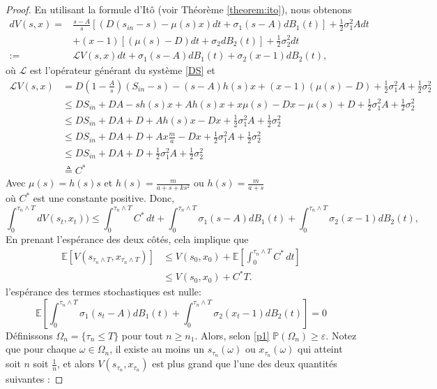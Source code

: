 \documentclass[12pt,a4paper]{report}%
\begin{document}
\begin{proof}
	En utilisant la formule d'Itô (voir Théorème \ref{theorem:ito}), nous obtenons
	$$
	\begin{aligned}
		dV(s, x) = & \frac{s-A}{s}\left[\left(D(s_{in}-s) -\mu(s)x \right) dt + \sigma_1(s-A) dB_1(t)\right] + \frac{1}{2} \sigma_1^2 A dt \\
		& + (x-1)\left[\left(\mu(s)  - D\right) dt + \sigma_2 dB_2(t)\right] + \frac{1}{2} \sigma_2^2 dt \\
		:= & \mathcal{L}V(s, x) dt + \sigma_1(s-A) dB_1(t) + \sigma_2(x-1) dB_2(t),
	\end{aligned}
	$$
	où \(\mathcal{L}\) est l'opérateur générant du système \eqref{DS} et
	$$
	\begin{aligned}
		\mathcal{L}V(s, x)&= D(1-\frac{A}{s})(S_{in}-s)-(s-A)h(s)x+(x-1)(\mu(s)-D)+\frac{1}{2}\sigma_1^2 A+\frac{1}{2}\sigma_2^2\\
		&\leqslant DS_{in}+DA-sh(s)x+Ah(s)x+x\mu(s)-Dx-\mu(s)+D+\frac{1}{2}\sigma_1^2 A+\frac{1}{2}\sigma_2^2\\
		&\leqslant DS_{in}+DA+D+Ah(s)x-Dx+\frac{1}{2}\sigma_1^2 A+\frac{1}{2}\sigma_2^2\\
		&\leqslant DS_{in}+DA+D+Ax\frac{m}{a}-Dx+\frac{1}{2}\sigma_1^2 A+\frac{1}{2}\sigma_2^2\\
		&\leqslant DS_{in}+DA+D+\frac{1}{2}\sigma_1^2 A+\frac{1}{2}\sigma_2^2\\
		&\triangleq C^*
	\end{aligned}
	$$
	Avec $\mu(s)=h(s) s$ et $h(s)=\frac{m}{a+s+ks^2}$ ou $h(s)=\frac{m}{a+s}$\\
	où $C^*$ est une constante positive. Donc,
	\[
	\int_0^{\tau_n \wedge T} dV(s_t, x_t)) \leq \int_0^{\tau_n \wedge T} C^* \, dt + \int_0^{\tau_n \wedge T} \sigma_1 (s - A) dB_1(t) + \int_0^{\tau_n \wedge T} \sigma_2 (x - 1) dB_2(t),
	\]
	En prenant l'espérance des deux côtés, cela implique que
	\begin{equation}\label{p2}
		\begin{aligned}
			\mathbb{E}[V(s_{\tau_n \wedge T}, x_{\tau_n \wedge T})]& \leq V(s_0, x_0) + \mathbb{E} \left[\int_0^{\tau_n \wedge T} C^* \, dt \right]\\
			&\leq V(s_0, x_0) + C^* T. 
		\end{aligned}
	\end{equation}
	l'espérance des termes stochastiques est nulle:
	\[
	\mathbb{E}\left[ \int_0^{\tau_n \wedge T} \sigma_1 (s_t - A) dB_1(t) + \int_0^{\tau_n \wedge T}  \sigma_2 (x_t - 1) dB_2(t) \right] = 0
	\]
	Définissons \(\Omega_n = \{\tau_n \leq T\}\) pour tout \(n \geqslant n_1\). Alors, selon \eqref{p1} \(\mathbb{P}(\Omega_n) \geq \varepsilon\). Notez que pour chaque \(\omega \in \Omega_n\), il existe au moins un \(s_{\tau_n}( \omega)\) ou \(x_{\tau_n}( \omega)\) qui atteint soit \(n\) soit \(\frac{1}{n}\), et alors \(V(s_{\tau_n}, x_{\tau_n})\) est plus grand que l'une des deux quantités suivantes :

\end{proof}
\end{document}
